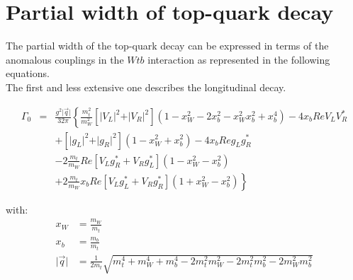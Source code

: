 

\section{Partial width of top-quark decay}

The partial width of the top-quark decay can be expressed in terms of the anomalous couplings in the $Wtb$ interaction as represented in the following equations.\\
The first and less extensive one describes the longitudinal decay.

\begin{eqnarray}
  \Gamma_{0} & = & \frac{g^{2} \vert \vec{q} \vert}{32 \pi} \left\lbrace \frac{m_{t}^{2}}{m_{W}^{2}} \left[ \vert V_{L} \vert^{2} + \vert V_{R} \vert^{2} \right] (1 - x_{W}^{2} - 2x_{b}^{2} -x_{W}^{2} x_{b}^{2} + x_{b}^{4}) - 4x_{b}Re V_{L}V_{R}^{*} \right. \nonumber \\
             &   & + \left[ \vert g_{L} \vert^{2} + \vert g_{R} \vert^{2} \right] (1 - x_{W}^{2} + x_{b}^{2}) - 4 x_{b} Re g_{L} g_{R}^{*} \nonumber \\
             &   & - 2 \frac{m_{t}}{m_{W}} Re \left[ V_{L}g_{R}^{*} + V_{R}g_{L}^{*} \right] (1- x_{W}^{2} - x_{b}^{2}) \nonumber \\
             &   & \left. +2 \frac{m_t}{m_W} x_b Re \left[ V_{L}g_{L}^{*} + V_{R}g_{R}^{*} \right] (1+ x_{W}^{2} - x_{b}^{2}) \right\rbrace
\end{eqnarray}

with:
\begin{subequations} \label{eq::Simplified}
 \begin{align} 
  x_W & = \frac{m_{W}}{m_{t}} \\
  x_b & = \frac{m_{b}}{m_{t}} \\
  \vert \vec{q} \vert & = \frac{1}{2 m_{t}} \sqrt{m_{t}^{4} + m_{W}^{4} + m_{b}^{4} - 2m_{t}^{2} m_{W}^{2} - 2m_{t}^{2} m_{b}^{2} - 2m_{W}^{2}m_{b}^{2}}  
 \end{align}
\end{subequations}

